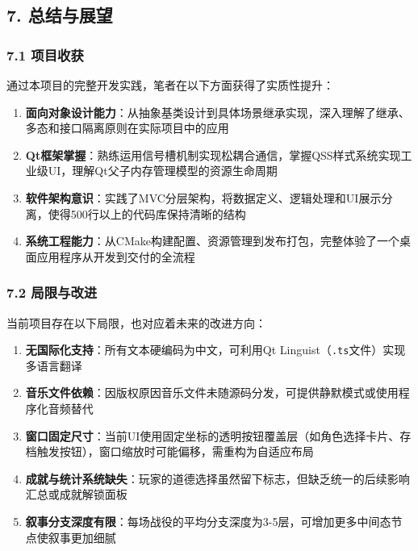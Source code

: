 \hypertarget{ux603bux7ed3ux4e0eux5c55ux671b}{%
\subsection{7. 总结与展望}\label{ux603bux7ed3ux4e0eux5c55ux671b}}

\hypertarget{ux9879ux76eeux6536ux83b7}{%
\subsubsection{7.1 项目收获}\label{ux9879ux76eeux6536ux83b7}}

通过本项目的完整开发实践，笔者在以下方面获得了实质性提升：

\begin{enumerate}
\def\labelenumi{\arabic{enumi}.}
\tightlist
\item
  \textbf{面向对象设计能力}：从抽象基类设计到具体场景继承实现，深入理解了继承、多态和接口隔离原则在实际项目中的应用
\item
  \textbf{Qt框架掌握}：熟练运用信号槽机制实现松耦合通信，掌握QSS样式系统实现工业级UI，理解Qt父子内存管理模型的资源生命周期
\item
  \textbf{软件架构意识}：实践了MVC分层架构，将数据定义、逻辑处理和UI展示分离，使得500行以上的代码库保持清晰的结构
\item
  \textbf{系统工程能力}：从CMake构建配置、资源管理到发布打包，完整体验了一个桌面应用程序从开发到交付的全流程
\end{enumerate}

\hypertarget{ux5c40ux9650ux4e0eux6539ux8fdb}{%
\subsubsection{7.2 局限与改进}\label{ux5c40ux9650ux4e0eux6539ux8fdb}}

当前项目存在以下局限，也对应着未来的改进方向：

\begin{enumerate}
\def\labelenumi{\arabic{enumi}.}
\tightlist
\item
  \textbf{无国际化支持}：所有文本硬编码为中文，可利用Qt
  Linguist（\texttt{.ts}文件）实现多语言翻译
\item
  \textbf{音乐文件依赖}：因版权原因音乐文件未随源码分发，可提供静默模式或使用程序化音频替代
\item
  \textbf{窗口固定尺寸}：当前UI使用固定坐标的透明按钮覆盖层（如角色选择卡片、存档触发按钮），窗口缩放时可能偏移，需重构为自适应布局
\item
  \textbf{成就与统计系统缺失}：玩家的道德选择虽然留下标志，但缺乏统一的后续影响汇总或成就解锁面板
\item
  \textbf{叙事分支深度有限}：每场战役的平均分支深度为3-5层，可增加更多中间态节点使叙事更加细腻
\end{enumerate}

